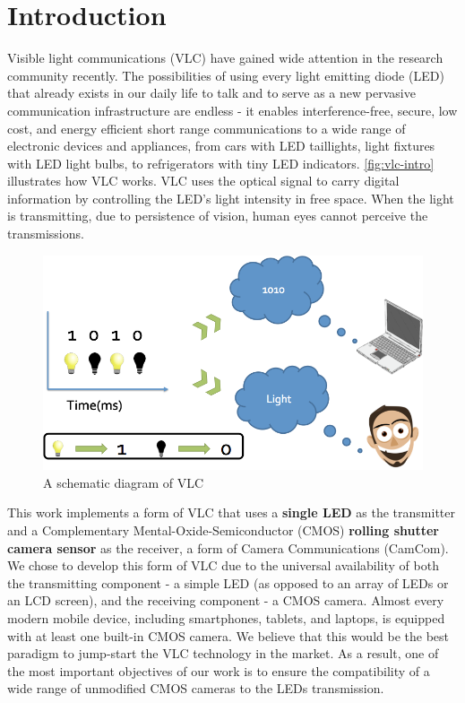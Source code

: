 \section{Introduction}

Visible light communications (VLC) have gained wide attention in the research community recently.
The possibilities of using every light emitting diode (LED) that already exists in our daily life to talk and to serve as
a new pervasive communication infrastructure are endless - it enables interference-free, secure, low cost, and energy efficient short range communications to a wide range of electronic devices and appliances, from cars with LED taillights, light fixtures with LED light bulbs, to refrigerators with tiny LED indicators. \autoref{fig:vlc-intro} illustrates how VLC works. VLC uses the optical signal to carry digital information by controlling the LED's light intensity in free space. When the light is transmitting, due to persistence of vision, human eyes cannot perceive the transmissions.

\begin{figure}[!t]
	\includegraphics[scale=0.25]{fig/vlc_intro.png}
	\centering
	\caption{A schematic diagram of VLC}
	\label{fig:vlc-intro}
\end{figure}

This work implements a form of VLC that uses a \textbf{single LED} as the transmitter and a Complementary Mental-Oxide-Semiconductor (CMOS) \textbf{rolling shutter camera sensor} as the receiver, a form of Camera Communications (CamCom).
We chose to develop this form of VLC due to the universal availability of both the transmitting component - a simple LED (as opposed to an array of LEDs or an LCD screen), and the receiving component - a CMOS camera. 
Almost every modern mobile device, including smartphones, tablets, and laptops, is equipped with at least one built-in CMOS camera. 
We believe that this would be the best paradigm to jump-start the VLC technology in the market. 
As a result, one of the most important objectives of our work is to ensure the compatibility of a wide range of unmodified CMOS cameras to the LEDs transmission. 

